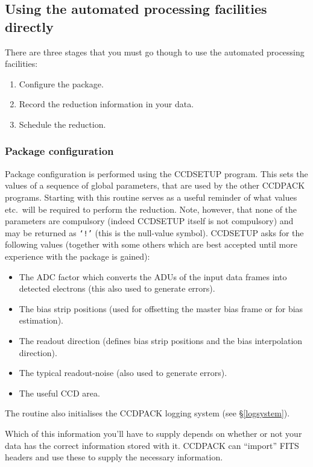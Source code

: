 \documentclass[twoside,11pt]{article}
\newcommand{\hyperref}[4]{#2\ref{#4}#3}
\newcommand{\htmlref}[2]{#1}
\newcommand{\xlabel}[1]{}
\renewcommand{\_}{\texttt{\symbol{95}}}
\newcommand{\text}[1]{{\small \tt #1}}
\newcommand{\routine}[1]{{\sc #1}}
\newcommand{\xroutine}[1]{\htmlref{{\sc #1}}{#1}}
\begin{document}
\subsection{Using the automated processing facilities directly}

There are three stages that you must go though to use the automated
processing facilities:
\begin{enumerate}
\item Configure the package.
\item Record the reduction information in your data.
\item Schedule the reduction.
\end{enumerate}

\subsubsection{Package configuration\xlabel{configuration}
               \label{configuration}}
Package configuration is performed using the \xroutine{CCDSETUP}
program.
This sets the values of a sequence of global parameters, that are used
by the other CCDPACK programs.
Starting with this routine serves as a useful reminder of what values
etc.\ will be required to perform the reduction.
Note, however, that none of the parameters are compulsory (indeed
\routine{CCDSETUP} itself is not compulsory) and may be returned as \text{`!'}
(this is the null-value symbol).
\routine{CCDSETUP} asks for the following values (together with some others
which are best accepted until more experience with the package is
gained):
\begin{itemize}
\item The ADC factor which converts the
ADUs of the input data frames into detected electrons (this also
used to generate errors).
\item The bias strip positions (used for offsetting the master bias
frame or for bias estimation).
\item The readout direction (defines bias strip positions and the
bias interpolation direction).
\item The typical readout-noise (also used to generate errors).
\item The useful CCD area.
\end{itemize}
The routine also initialises the CCDPACK logging system (see
\hyperref{later}{\S}{}{logsystem}).

Which of this information you'll have to supply depends on whether or
not your data has the correct information stored with it.
CCDPACK can ``import'' FITS headers and use these to supply the
necessary information.
\end{document}
